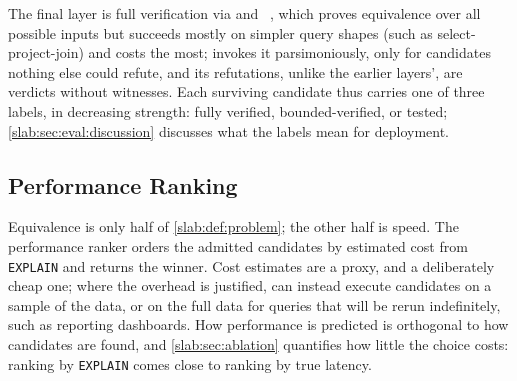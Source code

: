 The final layer is full verification via \cosette and
\spes~\cite{chu2017cosette,zhou2022spes}, which proves equivalence
over all possible inputs but succeeds mostly on simpler query shapes
(such as select-project-join) and costs the most; \slabcity invokes it
parsimoniously, only for candidates nothing else could refute, and its
refutations, unlike the earlier layers', are verdicts without
witnesses. Each surviving candidate thus carries one of three labels,
in decreasing strength: fully verified, bounded-verified, or tested;
\cref{slab:sec:eval:discussion} discusses what the labels mean for
deployment.

\subsection{Performance Ranking}
\label{slab:sec:perfranking}

Equivalence is only half of \cref{slab:def:problem}; the other half is
speed. The performance ranker orders the admitted candidates by
estimated cost from \texttt{EXPLAIN} and returns the winner. Cost
estimates are a proxy, and a deliberately cheap one; where the
overhead is justified, \slabcity can instead execute candidates on a
sample of the data, or on the full data for queries that will be rerun
indefinitely, such as reporting dashboards. How performance is
predicted is orthogonal to how candidates are found, and
\cref{slab:sec:ablation} quantifies how little the choice costs:
ranking by \texttt{EXPLAIN} comes close to ranking by true latency.
